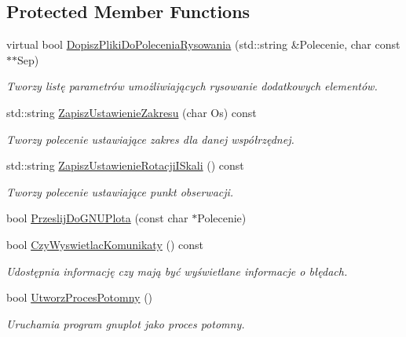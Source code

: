 \subsection*{Protected Member Functions}
\begin{DoxyCompactItemize}
\item 
virtual bool \hyperlink{class_pz_g_1_1_lacze_do_g_n_u_plota_a25585ec3f1bd3b6bf42f374c38b8d237}{Dopisz\+Pliki\+Do\+Polecenia\+Rysowania} (std\+::string \&Polecenie, char const $\ast$$\ast$Sep)
\begin{DoxyCompactList}\small\item\em Tworzy listę parametrów umożliwiających rysowanie dodatkowych elementów. \end{DoxyCompactList}\item 
std\+::string \hyperlink{class_pz_g_1_1_lacze_do_g_n_u_plota_a4579aecf7b4777fdde0cae4e98c275c2}{Zapisz\+Ustawienie\+Zakresu} (char Os) const
\begin{DoxyCompactList}\small\item\em Tworzy polecenie ustawiające zakres dla danej współrzędnej. \end{DoxyCompactList}\item 
std\+::string \hyperlink{class_pz_g_1_1_lacze_do_g_n_u_plota_aa92b463e8cbae31b50dd797a4183bce8}{Zapisz\+Ustawienie\+Rotacji\+I\+Skali} () const
\begin{DoxyCompactList}\small\item\em Tworzy polecenie ustawiające punkt obserwacji. \end{DoxyCompactList}\item 
bool \hyperlink{class_pz_g_1_1_lacze_do_g_n_u_plota_a5063854b7232a7951d120a21df63f2b7}{Przeslij\+Do\+G\+N\+U\+Plota} (const char $\ast$Polecenie)
\item 
bool \hyperlink{class_pz_g_1_1_lacze_do_g_n_u_plota_a5e4f3a226ed36f7110032d802d84847c}{Czy\+Wyswietlac\+Komunikaty} () const
\begin{DoxyCompactList}\small\item\em Udostępnia informację czy mają być wyświetlane informacje o błędach. \end{DoxyCompactList}\item 
bool \hyperlink{class_pz_g_1_1_lacze_do_g_n_u_plota_a1c7b9acc40de8d8bbb40fb0722512933}{Utworz\+Proces\+Potomny} ()
\begin{DoxyCompactList}\small\item\em Uruchamia program {\itshape gnuplot} jako proces potomny. \end{DoxyCompactList}\item 
$$
\end{DoxyCompactItemize}

